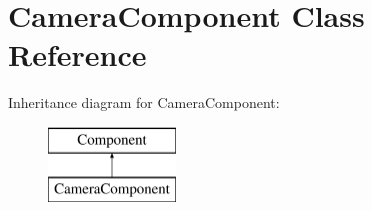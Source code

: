 \hypertarget{class_camera_component}{}\section{Camera\+Component Class Reference}
\label{class_camera_component}
Inheritance diagram for Camera\+Component\+:\begin{figure}[H]
\begin{center}
\leavevmode
\includegraphics[height=2.000000cm]{class_camera_component}
\end{center}
\end{figure}
